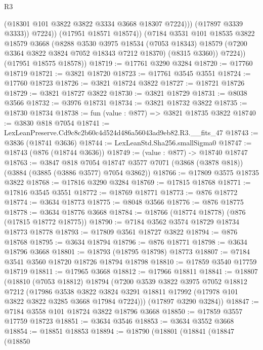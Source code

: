 \begin{lexlean}{R3}
\begin{coremodule}
                    (@18301 @101 @3822 @3822 @3334 @3668 @18307 @7224)))
                (@17897 @3339 @3333))
              @7224))
          (@17951 @18571 @18574))
        (@7184
          @3531
          @101
          @18535
          @3822
          @18579
          @3668
          (@8288
            @3530
            @3975
            @18534
            (@7053 @18343)
            @18579
            (@7200 @3364 @3822 @3824 @7052 @18343 @7212 @18370)
            (@8315 @3360))
          @7224))
      (@17951 @18575 @18578))
@18719 := @17761 @3290 @3284
@18720 := @17760 @18719
@18721 := @3821 @18720
@18723 := @17761 @3545 @3551
@18724 := @17760 @18723
@18726 := @3821 @18724 @3822
@18727 := @18721 @18726
@18729 := @3821 @18727 @3822
@18730 := @3821 @18729
@18731 := @8038 @3566
@18732 := @3976 @18731
@18734 := @3821 @18732 @3822
@18735 := @18730 @18734
@18738 := fun (value : @877) => @3821 @18735 @3822
@18740 := @3830 @818 @7054
@18741 := LexLeanPreserve.Cd9c8c2b60c4d524d486a56043ad9eb82.R3.__fits_47
@18743 := @3836 (@18741 @3636)
@18744 := LexLeanStd.Sha256.smallSigma0
@18747 := @18743 (@876 (@18744 @3636))
@18749 := (value : @877) -> @18740 @18747
@18763 := @3847
    @818
    @7054
    @18747
    @3577
    @7071
    (@3868 (@3878 @818))
    (@3884 (@3885 (@3886 @3577) @7054 @3862))
@18766 := @17809 @3575 @18735 @3822
@18768 := @17816 @3290 @3284
@18769 := @17815 @18768
@18771 := @17816 @3545 @3551
@18772 := @18769 @18771
@18773 := @876 @18772
@18774 := @3634 @18773
@18775 := @8048 @3566
@18776 := @876 @18775
@18778 := @3634 @18776 @3668
@18784 := @18766 (@18774 @18778) (@876 (@17815 @18772 @18775))
@18790 := @7184 @3562 @3574 @18729 @18734 @18773 @18778
@18793 := @17809 @3561 @18727 @3822
@18794 := @876 @18768
@18795 := @3634 @18794
@18796 := @876 @18771
@18798 := @3634 @18796 @3668
@18801 := @18793 (@18795 @18798) @18773
@18807 := @7184 @3541 @3560 @18720 @18726 @18794 @18798
@18810 := @17859 @3540 @17759 @18719
@18811 := @17965 @3668
@18812 := @17966 @18811
@18841 := @18807
    (@18810
      (@7053 @18812)
      @18794
      (@7200
        @3539
        @3822
        @3975
        @7052
        @18812
        @7212
        (@17986
          @3538
          @3822
          @3824
          @3291
          @18811
          @17992
          (@17978 @101 @3822 @3822 @3285 @3668 @17984 @7224)))
      (@17897 @3290 @3284))
@18847 := @7184 @3558 @101 @18724 @3822 @18796 @3668
@18850 := @17859 @3557 @17759 @18723
@18851 := @3634 @3546
@18853 := @3634 @3552 @3668
@18854 := @18851 @18853
@18894 := @18790
    (@18801
      (@18841
        (@18847
          (@18850

\end{coremodule}
\end{lexlean}
